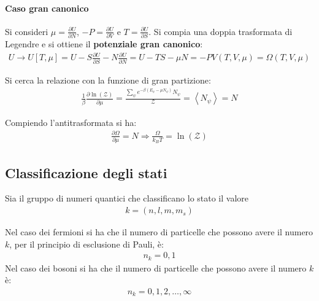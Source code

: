 \paragraph{Caso gran canonico} %
Si consideri $\mu=\frac{\partial U}{\partial N}$, $-P=\frac{\partial U}{\partial V}$ e $T=\frac{\partial U}{\partial S}$. Si compia una doppia trasformata di Legendre e si ottiene il \textbf{potenziale gran canonico}:
\begin{equation}\begin{split}
U\longrightarrow U\left[T,\mu\right]=U-S\frac{\partial U}{\partial S}-N\frac{\partial U}{\partial N}=U-TS-\mu N=-PV\left(T,V,\mu\right)=\Omega \left(T,V,\mu\right)
\end{split}\end{equation}

Si cerca la relazione con la funzione di gran partizione:
\begin{equation}\begin{split}
\frac{1}{\beta}\frac{\partial \ln{\left(\mathcal{Z}\right)}}{\partial \mu}=\frac{\sum_{\psi }{e^{-\beta \left(E_\psi -\mu N_\psi \right)}N_\psi }}{\mathcal{Z}}=\left\langle N_\psi  \right\rangle=N
\end{split}\end{equation}

Compiendo l'antitrasformata si ha:
\begin{equation}\begin{split}
\frac{\partial \Omega}{\partial \mu}=N \Longrightarrow \frac{\Omega}{k_BT}=\ln{\left(\mathcal{Z}\right)}
\end{split}\end{equation}

\subsection{Classificazione degli stati} %
Sia il gruppo di numeri quantici che classificano lo stato il valore
\begin{equation}\begin{split}
k=\left(n,l,m,m_s\right)
\end{split}\end{equation}

Nel caso dei fermioni si ha che il numero di particelle che possono avere il numero $k$, per il principio di esclusione di Pauli, è:
\begin{equation}\begin{split}
n_k=0,1
\end{split}\end{equation}
Nel caso dei bosoni si ha che il numero di particelle che possono avere il numero $k$ è:
\begin{equation}\begin{split}
n_k=0,1,2,\dots,\infty 
\end{split}\end{equation}

